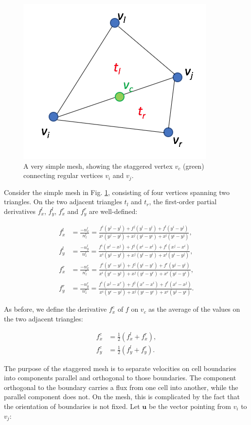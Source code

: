 \documentclass{article}
\begin{document}
\begin{figure}[H] \label{fig:mesh_staggeredvertex}
  \includegraphics[width=0.3\linewidth]{Fig_staggeredvertex.png}
  \caption{A very simple mesh, showing the staggered vertex $v_c$ (green) connecting regular vertices $v_i$ and $v_j$.}
\end{figure}

Consider the simple mesh in Fig. \ref{fig:mesh_staggeredvertex}, consisting of four vertices spanning two triangles. On the two adjacent triangles $t_l$ and $t_r$, the first-order partial derivatives $f_x^l$, $f_y^l$, $f_x^r$ and $f_y^r$ are well-defined:

\begin{align} \label{eq:disc_fxlfyl}
f_x^l &= \frac{ -n_x^l }{ n_z^l } = \frac{ f^i (y^j - y^l) + f^j (y^l - y^i) + f^l (y^i - y^j)}{ x^i (y^j - y^l) + x^j (y^l - y^i) + x^l (y^i - y^j) }, \\
f_y^l &= \frac{ -n_y^l }{ n_z^l } = \frac{ f^i (x^l - x^j) + f^j (x^i - x^l) + f^l (x^j - x^i)}{ x^i (y^j - y^l) + x^j (y^l - y^i) + x^l (y^i - y^j) }, \\
f_x^r &= \frac{ -n_x^r }{ n_z^r } = \frac{ f^i (y^r - y^j) + f^j (y^i - y^r) + f^r (y^j - y^i)}{ x^i (y^r - y^j) + x^j (y^i - y^r) + x^r (y^j - y^i) }, \\
f_y^r &= \frac{ -n_y^r }{ n_z^r } = \frac{ f^i (x^j - x^r) + f^j (x^r - x^i) + f^r (x^i - x^j)}{ x^i (y^r - y^j) + x^j (y^i - y^r) + x^r (y^j - y^i) }.
\end{align}

As before, we define the derivative $f_x^c$ of $f$ on $v_c$ as the average of the values on the two adjacent triangles:

\begin{align} \label{eq:disc_fxcfyc}
f_x^c &= \frac12 (f_x^l + f_x^r), \\
f_y^c &= \frac12 (f_y^l + f_y^r).
\end{align}

The purpose of the staggered mesh is to separate velocities on cell boundaries into components parallel and orthogonal to those boundaries. The component orthogonal to the boundary carries a flux from one cell into another, while the parallel component does not. On the mesh, this is complicated by the fact that the orientation of boundaries is not fixed. Let $\textbf{u}$ be the vector pointing from $v_i$ to $v_j$:
\end{document}
